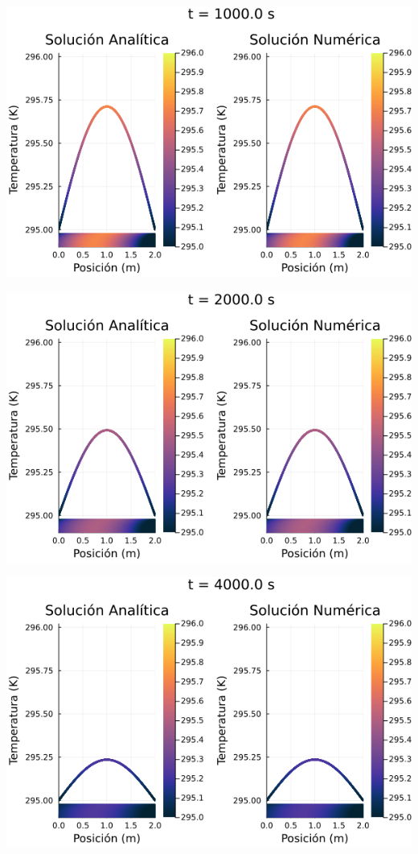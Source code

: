 \documentclass[12pt]{article}
\begin{document}
\begin{center}
    \includegraphics[width=1\linewidth]{Ejemplo_01_t_1.png}
\end{center}

\begin{center}
    \includegraphics[width=1\linewidth]{Ejemplo_01_t_2.png}
\end{center}

\begin{center}
    \includegraphics[width=1\linewidth]{Ejemplo_01_t_3.png}
\end{center}
\end{document}
